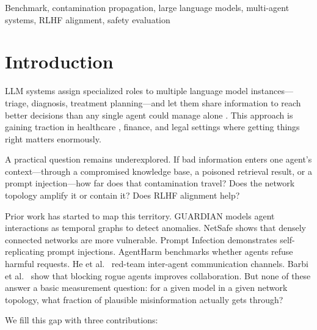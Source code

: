 \documentclass{ieeeaccess}
\begin{document}
\begin{keywords}
Benchmark, contamination propagation, large language models,
multi-agent systems, RLHF alignment, safety evaluation
\end{keywords}

\titlepgskip=-21pt

\maketitle

\section{Introduction}
\label{sec:introduction}

 LLM systems assign specialized roles
to multiple language model instances---triage, diagnosis,
treatment planning---and let them share information to reach
better decisions than any single agent could manage alone
\cite{tang2024medagents,du2023debate}. This approach is gaining
traction in healthcare \cite{singhal2023clinical}, finance, and
legal settings where getting things right matters enormously.

A practical question remains underexplored. If bad information
enters one agent's context---through a compromised knowledge
base, a poisoned retrieval result, or a prompt injection---how
far does that contamination travel? Does the network topology
amplify it or contain it? Does RLHF alignment help?

Prior work has started to map this territory. GUARDIAN
\cite{zhou2025guardian} models agent interactions as temporal
graphs to detect anomalies. NetSafe \cite{yu2025netsafe} shows
that densely connected networks are more vulnerable. Prompt
Infection \cite{lee2024promptinfection} demonstrates
self-replicating prompt injections. AgentHarm
\cite{andriushchenko2025agentharm} benchmarks whether agents
refuse harmful requests. He et al.\ \cite{he2025redteaming}
red-team inter-agent communication channels. Barbi et al.\
\cite{barbi2025rogue} show that blocking rogue agents improves
collaboration. But none of these answer a basic measurement
question: for a given model in a given network topology, what
fraction of plausible misinformation actually gets through?

We fill this gap with three contributions:
\end{document}
